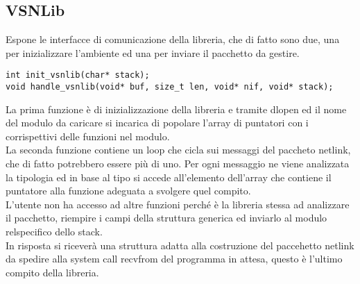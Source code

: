 \subsection{VSNLib}
Espone le interfacce di comunicazione della libreria, che di fatto sono due, una per inizializzare l'ambiente ed una per inviare il pacchetto da gestire.\\
\begin{lstlisting}[style=CStyle]
int init_vsnlib(char* stack);
void handle_vsnlib(void* buf, size_t len, void* nif, void* stack);
\end{lstlisting}
La prima funzione \`e di inizializzazione della libreria e tramite dlopen ed il nome del modulo da caricare si incarica di popolare l'array di puntatori con i corrispettivi delle funzioni nel modulo.\\
La seconda funzione contiene un loop che cicla sui messaggi del paccheto netlink, che di fatto potrebbero essere pi\`u di uno. Per ogni messaggio ne viene analizzata la tipologia ed in base al tipo si accede all'elemento dell'array che contiene il puntatore alla funzione adeguata a svolgere quel compito.\\
L'utente non ha accesso ad altre funzioni perch\'e \`e la libreria stessa ad analizzare il pacchetto, riempire i campi della struttura generica ed inviarlo al modulo relspecifico dello stack.\\
In risposta si ricever\`a una struttura adatta alla costruzione del paccehetto netlink da spedire alla system call recvfrom del programma in attesa, questo \`e l'ultimo compito della libreria.
